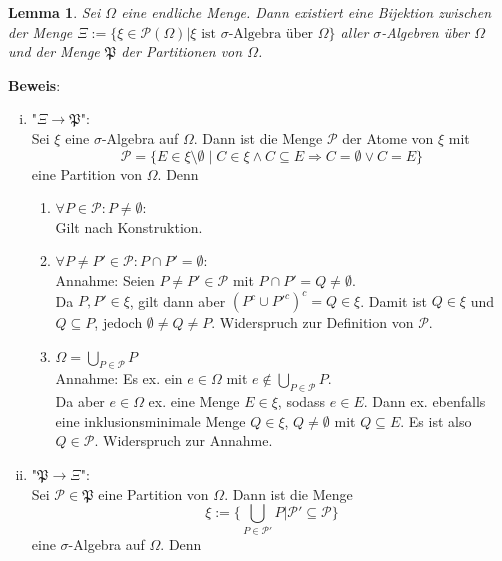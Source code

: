 \documentclass[11pt,a4paper,ngerman]{article}
\newcommand{\set}[1]{ \{ #1 \}}
\newtheorem{lemma}{\bfseries Lemma}
\begin{document}
\begin{lemma}
Sei $\Omega$ eine endliche Menge. Dann existiert eine Bijektion zwischen der Menge $\Xi := \set{\xi \in \mathcal{P}(\Omega) | \xi \text{ ist $\sigma$-Algebra über } \Omega}$ aller $\sigma$-Algebren über $\Omega$ und der Menge $\mathfrak{P}$  der Partitionen von $\Omega$.	
\end{lemma}

\textbf{Beweis}: 
\begin{enumerate}[(i)]
\item "$\Xi \to \mathfrak{P}$": \\
Sei $\xi$ eine $\sigma$-Algebra auf $\Omega$. Dann ist die Menge $\mathcal{P}$ der Atome von $\xi$ mit
\begin{equation*}\mathcal{P} = \{ E \in \xi \setminus \emptyset \; | \; C \in \xi \land C \subseteq E \Rightarrow C = \emptyset \lor C = E  \} \end{equation*}
eine Partition von $\Omega$. Denn 

\begin{enumerate}[(1)]
\item $\forall P \in \mathcal{P}: P \neq \emptyset$: \\
Gilt nach Konstruktion.

\item $\forall P \neq P' \in \mathcal{P}: P \cap P' = \emptyset$: \\
Annahme: Seien $P \neq P' \in \mathcal{P}$ mit $P \cap P' = Q \neq \emptyset$.\\
 Da $P, P' \in \xi$, gilt dann aber $(P^c \cup P'^c)^c = Q \in \xi$.
Damit ist $Q \in\xi$ und $Q \subseteq P$, jedoch $\emptyset \neq Q \neq P$. Widerspruch zur Definition von $\mathcal{P}$.

\item $\Omega = \bigcup_{P \in \mathcal{P}} P $ \\
Annahme: Es ex. ein $e \in \Omega$ mit $e \notin  \bigcup_{P \in \mathcal{P}} P$. \\
Da aber $e \in \Omega$ ex. eine Menge $E \in \xi$, sodass $e  \in E$. Dann ex. ebenfalls eine inklusionsminimale Menge $Q \in \xi$, $Q \neq \emptyset$ mit $Q \subseteq E$.
Es ist also $Q \in \mathcal{P}$. Widerspruch zur Annahme. \\
\end{enumerate}

\item "$\mathfrak{P} \to \Xi$": \\
Sei $\mathcal{P} \in \mathfrak{P}$ eine Partition von $\Omega$. Dann ist die Menge
\begin{equation*}\xi := \{ \bigcup_{P \in \mathcal{P'}} P | \mathcal{P'} \subseteq \mathcal{P} \} \end{equation*}
eine $\sigma$-Algebra auf $\Omega$. Denn


\end{enumerate}
\end{document}
